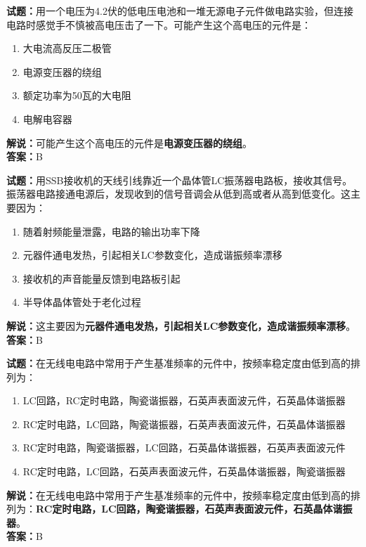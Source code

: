 \documentclass{ctexbook}
\begin{document}
\bigskip


\noindent\textbf{试题：}用一个电压为4.2伏的低电压电池和一堆无源电子元件做电路实验，但连接电路时感觉手不慎被高电压击了一下。可能产生这个高电压的元件是：
\begin{enumerate}[leftmargin=3em]
\item 大电流高反压二极管
\item 电源变压器的绕组
\item 额定功率为50瓦的大电阻
\item 电解电容器
\end{enumerate}
\noindent\textbf{解说：}可能产生这个高电压的元件是\textbf{电源变压器的绕组}。\\\noindent\textbf{答案：}B

\bigskip


\noindent\textbf{试题：}用SSB接收机的天线引线靠近一个晶体管LC振荡器电路板，接收其信号。振荡器电路接通电源后，发现收到的信号音调会从低到高或者从高到低变化。这主要因为：
\begin{enumerate}[leftmargin=3em]
\item 随着射频能量泄露，电路的输出功率下降
\item 元器件通电发热，引起相关LC参数变化，造成谐振频率漂移
\item 接收机的声音能量反馈到电路板引起
\item 半导体晶体管处于老化过程
\end{enumerate}
\noindent\textbf{解说：}这主要因为\textbf{元器件通电发热，引起相关LC参数变化，造成谐振频率漂移}。\\\noindent\textbf{答案：}B



\bigskip


\noindent\textbf{试题：}在无线电电路中常用于产生基准频率的元件中，按频率稳定度由低到高的排列为：
\begin{enumerate}[leftmargin=3em]
\item LC回路，RC定时电路，陶瓷谐振器，石英声表面波元件，石英晶体谐振器
\item RC定时电路，LC回路，陶瓷谐振器，石英声表面波元件，石英晶体谐振器
\item RC定时电路，陶瓷谐振器，LC回路，石英晶体谐振器，石英声表面波元件
\item RC定时电路，LC回路，石英声表面波元件，石英晶体谐振器，陶瓷谐振器
\end{enumerate}
\noindent\textbf{解说：}在无线电电路中常用于产生基准频率的元件中，按频率稳定度由低到高的排列为：\textbf{RC定时电路，LC回路，陶瓷谐振器，石英声表面波元件，石英晶体谐振器}。\\\noindent\textbf{答案：}B
\end{document}
